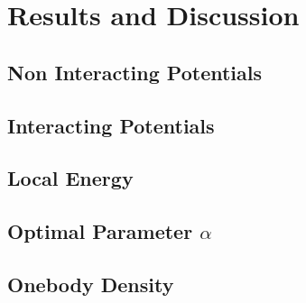 \section{Results and Discussion}\label{sec:Discussion}
\subsection{Non Interacting Potentials}
\subsection{Interacting Potentials}
\subsection{Local Energy}
\subsection{Optimal Parameter \(\alpha\)}
\subsection{Onebody Density}

